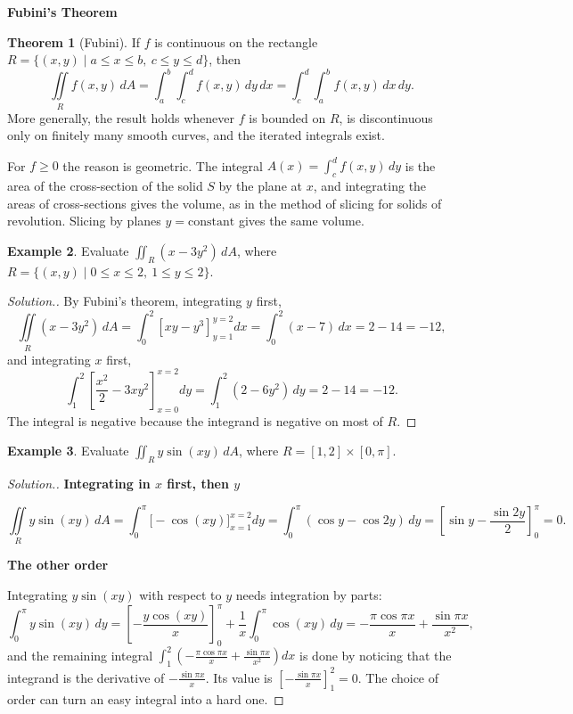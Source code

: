 \documentclass[11pt,a4paper]{article}
\theoremstyle{definition}
\newtheorem{thm}{Theorem}[subsection]
\newtheorem{exa}[thm]{Example}
\newenvironment{solution}
  {\renewcommand{\qedsymbol}{}\begin{proof}[\textit{Solution}.]}
  {\end{proof}}
\newcommand{\subhead}[1]{%
  \par\medskip\noindent\textbf{#1}\par\nobreak\smallskip}
\begin{document}
\subhead{Fubini's Theorem}

\begin{thm}[Fubini]
\label{thm:fubini}
If $f$ is continuous on the rectangle $R = \{ (x,y) \mid a\leq x \leq b,\
c\leq y\leq d\}$, then
\[\iint\limits_R f(x,y)\, dA = \int^b_a \int^d_c f(x,y)\,dy\, dx = \int^d_c
\int^b_a f(x,y)\,dx\, dy .\]
More generally, the result holds whenever $f$ is bounded on $R$, is
discontinuous only on finitely many smooth curves, and the iterated integrals
exist.
\end{thm}

For $f\geq 0$ the reason is geometric. The integral $A(x) = \int_c^d f(x,y)\,dy$
is the area of the cross-section of the solid $S$ by the plane at $x$, and
integrating the areas of cross-sections gives the volume, as in the method of
slicing for solids of revolution. Slicing by planes $y = \text{constant}$ gives
the same volume.

\begin{exa}
\label{ex:fubinipoly}
Evaluate $\iint_R (x-3y^2)\,dA$, where
$R = \{ (x,y) \mid 0\leq x \leq 2,\ 1 \leq y \leq 2 \}$.
\end{exa}

\begin{solution}
By Fubini's theorem, integrating $y$ first,
\[\iint\limits_R (x-3y^2)\,dA = \int^2_0\left[xy - y^3\right]_{y=1}^{y=2}dx =
\int^2_0 (x - 7)\,dx = 2 - 14 = -12 ,\]
and integrating $x$ first,
\[\int^2_1\left[\frac{x^2}{2} - 3xy^2\right]_{x=0}^{x=2}dy = \int^2_1 (2 -
6y^2)\, dy = 2 - 14 = -12 .\]
The integral is negative because the integrand is negative on most of $R$.
\end{solution}

\begin{exa}
\label{ex:ysinxy}
Evaluate $\iint_R y \sin (xy)\,dA$, where $R = [1,2]\times [0,\pi]$.
\end{exa}

\begin{solution}
\subhead{Integrating in $x$ first, then $y$}
\[\iint\limits_R y \sin (xy) \, dA = \int^{\pi}_0 \Big[-\cos(xy)\Big]_{x=1}^{x=2}
dy = \int^{\pi}_0 (\cos y - \cos 2y)\, dy = \left[\sin y - \frac{\sin
2y}{2}\right]_0^{\pi} = 0 .\]

\subhead{The other order}
Integrating $y\sin(xy)$ with respect to $y$ needs integration by parts:
\[\int^{\pi}_0 y\sin (xy)\,dy = \left[-\frac{y\cos(xy)}{x}\right]_0^{\pi} +
\frac1x\int_0^{\pi}\cos(xy)\,dy = -\frac{\pi \cos \pi x}{x} + \frac{\sin \pi
x}{x^2},\]
and the remaining integral
$\int^2_1 \left( -\frac{\pi \cos \pi x}{x} + \frac{\sin \pi x}{x^2}\right) dx$
is done by noticing that the integrand is the derivative of
$-\frac{\sin \pi x}{x}$. Its value is
$\left[-\frac{\sin \pi x}{x}\right]_1^2 = 0$. The choice of order can turn an
easy integral into a hard one.
\end{solution}
\end{document}
